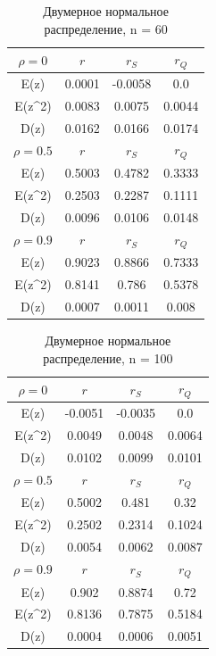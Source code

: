 \documentclass[a4paper]{article}
\begin{document}
	
	\begin{table}[H]
		\centering
		\begin{tabular}{| c | c | c | c |}
			
			\hline
			$\rho = 0$ & $r$      & $r_S$  & $r_Q$ \\
			\hline
			E(z)    & 0.0001 & -0.0058 & 0.0   \\
            E(z\^{}2)  & 0.0083 & 0.0075 & 0.0044 \\
            D(z)    & 0.0162 & 0.0166 & 0.0174 \\
			\hline
			$\rho = 0.5$ & $r$      & $r_S$  & $r_Q$ \\
			\hline
			E(z)      & 0.5003 & 0.4782 & 0.3333 \\
            E(z\^{}2)    & 0.2503 & 0.2287 & 0.1111 \\
            D(z)      & 0.0096 & 0.0106 & 0.0148 \\
			\hline
			$\rho = 0.9$ & $r$      & $r_S$  & $r_Q$ \\
			\hline
			E(z)      & 0.9023 & 0.8866 & 0.7333 \\
            E(z\^{}2)    & 0.8141 & 0.786 & 0.5378 \\
            D(z)      & 0.0007 & 0.0011 & 0.008 \\
			\hline
			
		\end{tabular}{}
		\caption{Двумерное нормальное распределение, n = 60}
		\label{tab:n60}
	\end{table}
	
	
	
	\begin{table}[H]
		\centering
		\begin{tabular}{| c | c | c | c |}
			
			\hline
			$\rho = 0$ & $r$      & $r_S$  & $r_Q$ \\
			\hline
			E(z)    & -0.0051 & -0.0035 & 0.0   \\
            E(z\^{}2)  & 0.0049 & 0.0048 & 0.0064 \\
            D(z)    & 0.0102 & 0.0099 & 0.0101 \\
			\hline
			$\rho = 0.5$ & $r$      & $r_S$  & $r_Q$ \\
			\hline
			E(z)      & 0.5002 & 0.481 & 0.32  \\
            E(z\^{}2)    & 0.2502 & 0.2314 & 0.1024 \\
            D(z)      & 0.0054 & 0.0062 & 0.0087 \\
			\hline
			$\rho = 0.9$ & $r$      & $r_S$  & $r_Q$ \\
			\hline
			E(z)      & 0.902 & 0.8874 & 0.72  \\
            E(z\^{}2)    & 0.8136 & 0.7875 & 0.5184 \\
            D(z)      & 0.0004 & 0.0006 & 0.0051 \\
			\hline
			
		\end{tabular}{}
		\caption{Двумерное нормальное распределение, n = 100}
		\label{tab:n100}
	\end{table}
	
\end{document}

